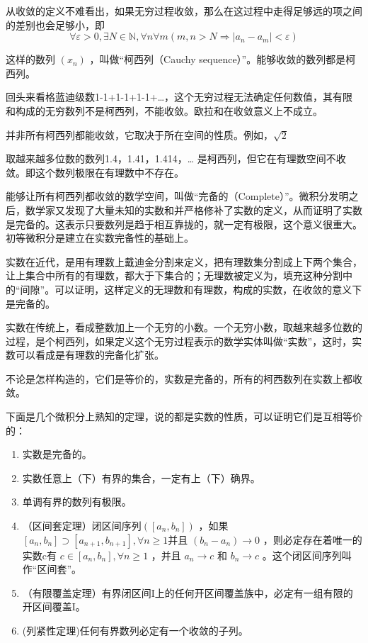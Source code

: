 从收敛的定义不难看出，如果无穷过程收敛，那么在这过程中走得足够远的项之间的差别也会足够小，即
\begin{equation}
	\forall \varepsilon > 0, \exists N \in \mathbb{N},\forall n \forall m ( m,n>N \Rightarrow |a_n-a_m| < \varepsilon )
\end{equation}

这样的数列 $ (x_n) $ ，叫做“柯西列（Cauchy sequence）”。能够收敛的数列都是柯西列。

回头来看格蓝迪级数1-1+1-1+1-1+…，这个无穷过程无法确定任何数值，其有限和构成的无穷数列不是柯西列，不能收敛。欧拉和在收敛意义上不成立。

并非所有柯西列都能收敛，它取决于所在空间的性质。例如，$ \sqrt{2} $

取越来越多位数的数列1.4，1.41，1.414，… 是柯西列，但它在有理数空间不收敛。即这个数列极限在有理数中不存在。

能够让所有柯西列都收敛的数学空间，叫做“完备的（Complete）”。微积分发明之后，数学家又发现了大量未知的实数和并严格修补了实数的定义，从而证明了实数是完备的。这表示只要数列是趋于相互靠拢的，就一定有极限，这个意义很重大。初等微积分是建立在实数完备性的基础上。

实数在近代，是用有理数上戴迪金分割来定义，把有理数集分割成上下两个集合，让上集合中所有的有理数，都大于下集合的；无理数被定义为，填充这种分割中的“间隙”。可以证明，这样定义的无理数和有理数，构成的实数，在收敛的意义下是完备的。

实数在传统上，看成整数加上一个无穷的小数。一个无穷小数，取越来越多位数的过程，是个柯西列，如果定义这个无穷过程表示的数学实体叫做“实数”，这时，实数可以看成是有理数的完备化扩张。

不论是怎样构造的，它们是等价的，实数是完备的，所有的柯西数列在实数上都收敛。

下面是几个微积分上熟知的定理，说的都是实数的性质，可以证明它们是互相等价的：

\kaishu
\setlength{\leftskip}{1em}
\begin{enumerate}
	\item 实数是完备的。
	
	\item 实数任意上（下）有界的集合，一定有上（下）确界。
	
	\item 单调有界的数列有极限。
	
	\item （区间套定理）闭区间序列$ ([a_n, b_n]) $	，如果$ [a_n, b_n]\supset [a_{n+1}, b_{n+1}], \forall n \ge 1  $并且 $ (b_n-a_n)\rightarrow 0 $ ，则必定存在着唯一的实数c有 $ c \in [a_n, b_n],\forall n \ge 1 $ ，并且 $ a_n \rightarrow c $ 和 $ b_n \rightarrow c $ 。这个闭区间序列叫作“区间套”。
	
	\item （有限覆盖定理）有界闭区间I上的任何开区间覆盖族中，必定有一组有限的开区间覆盖I。
	
	\item (列紧性定理)任何有界数列必定有一个收敛的子列。
\end{enumerate}

